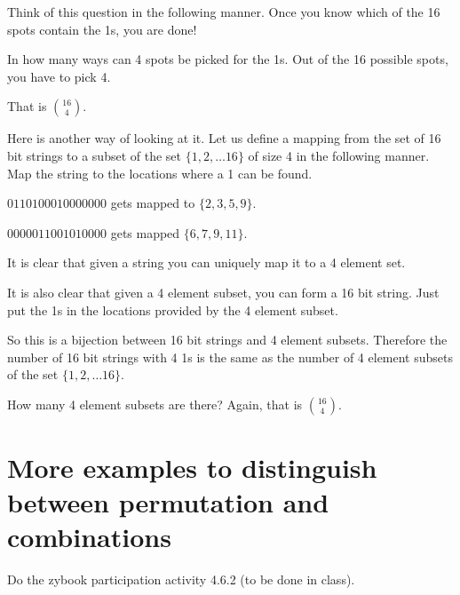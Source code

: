 \documentclass[12pt]{article}
\begin{document}
Think of this question in the following manner. Once you know which of the 16 spots contain the 1s, you are done!

In how many ways can 4 spots be picked for the 1s. Out of the 16 possible spots, you have to pick 4.

That is $\binom{16}{4}$.

Here is another way of looking at it. Let us define a mapping from the set of 16 bit strings to a subset of the set $\{1,2,\ldots 16\}$ of size 4 in the following manner. Map the string to the locations where a 1 can be found.

$0110100010000000$ gets mapped to $\{2,3,5,9\}$.

$0000 0110 0101 0000$ gets mapped $\{6,7,9,11\}$.

It is clear that given a string you can uniquely map it to a 4 element set.

It is also clear that given a 4 element subset, you can form a 16 bit string. Just put the 1s in the locations provided by the 4 element subset.

So this is a bijection between 16 bit strings and 4 element subsets. Therefore the number of 16 bit strings with 4 1s is the same as the number of 4 element subsets of the set $\{1,2,\ldots 16\}$.

How many 4 element subsets are there? Again, that is $\binom{16}{4}$.


\section*{More examples to distinguish between permutation and combinations}

Do the zybook participation activity 4.6.2 (to be done in class).
\end{document}
